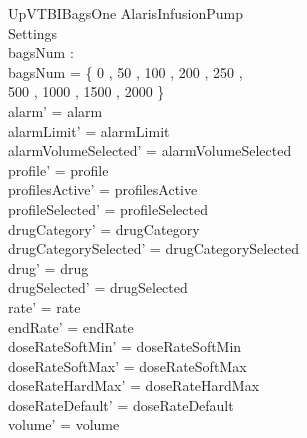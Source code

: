 \begin{schema}{UpVTBIBagsOne}
	\Delta AlarisInfusionPump\\
	 Settings\\
	bagsNum : \nat \rel \nat\\
	\where
	bagsNum = \{ 0 , 50 , 100 , 200 , 250 , \\
	500 , 1000 , 1500 , 2000 \}\\
	alarm' = alarm\\
	alarmLimit' = alarmLimit\\
	alarmVolumeSelected' = alarmVolumeSelected\\
	profile' = profile\\
	profilesActive' = profilesActive\\ 
	  profileSelected' = profileSelected\\
	drugCategory' = drugCategory\\ 
	drugCategorySelected' = drugCategorySelected\\
	\pagebreak 
	drug' = drug\\ 
	drugSelected' = drugSelected\\
	rate' = rate\\
	endRate' = endRate\\
	doseRateSoftMin' = doseRateSoftMin\\
	doseRateSoftMax' = doseRateSoftMax\\
	doseRateHardMax' = doseRateHardMax\\
	doseRateDefault' = doseRateDefault\\
	volume' = volume\\

\end{schema}
